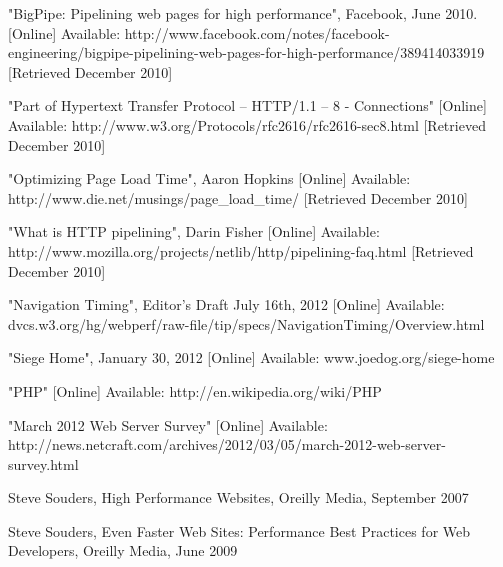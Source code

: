 \documentclass[12pt]{report}
\begin{document}
\begin{thebibliography}{2}

"BigPipe: Pipelining web pages for high performance", Facebook, June 2010. [Online]
Available: http://www.facebook.com/notes/facebook-engineering/bigpipe-pipelining-web-pages-for-high-performance/389414033919 [Retrieved December 2010]

"Part of Hypertext Transfer Protocol -- HTTP/1.1 – 8 - Connections" [Online]
Available: http://www.w3.org/Protocols/rfc2616/rfc2616-sec8.html [Retrieved December 2010]

"Optimizing Page Load Time", Aaron Hopkins [Online]
Available: http://www.die.net/musings/page\_load\_time/ [Retrieved December 2010]

"What is HTTP pipelining", Darin Fisher [Online]
Available: http://www.mozilla.org/projects/netlib/http/pipelining-faq.html [Retrieved December 2010]

"Navigation Timing", Editor's Draft July 16th, 2012 [Online]
Available: dvcs.w3.org/hg/webperf/raw-file/tip/specs/NavigationTiming/Overview.html

"Siege Home",  January 30, 2012 [Online]
Available: www.joedog.org/siege-home

"PHP" [Online]
Available: http://en.wikipedia.org/wiki/PHP

"March 2012 Web Server Survey" [Online]
Available: http://news.netcraft.com/archives/2012/03/05/march-2012-web-server-survey.html

Steve Souders, High Performance Websites, Oreilly Media, September 2007

Steve Souders, Even Faster Web Sites: Performance Best Practices for Web Developers, Oreilly Media, June 2009

\end{thebibliography}
\end{document}
